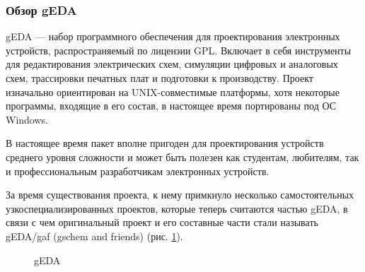 \subsubsection{Обзор gEDA}
\begin{par}
gEDA --- набор программного обеспечения для проектирования электронных устройств,
распространяемый по лицензии GPL. Включает в себя инструменты для редактирования
электрических схем, симуляции цифровых и аналоговых схем, трассировки печатных плат
и подготовки к производству. Проект изначально ориентирован на UNIX-совместимые
платформы, хотя некоторые программы, входящие в его состав, в настоящее время
портированы под ОС Windows\cite{geda}.
\end{par}
\begin{par}
В настоящее время пакет вполне пригоден для проектирования устройств среднего уровня
сложности и может быть полезен как студентам, любителям, так и профессиональным
разработчикам электронных устройств.
\end{par}
\begin{par}
За время существования проекта, к нему примкнуло несколько самостоятельных
узкоспециализированных проектов, которые теперь считаются частью gEDA, в
связи с чем оригинальный проект и его составные части стали называть
gEDA/gaf (gschem and friends) (рис. \ref{img:geda}).
\begin{figure}[ht]
	\caption{gEDA}
	\label{img:geda}
\end{figure}
\end{par}

